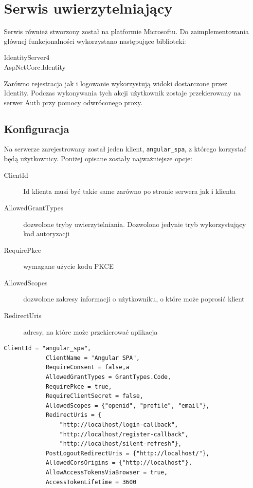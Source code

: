 \section{Serwis uwierzytelniający}
	Serwis również stworzony został na platformie Microsoftu.
	Do zaimplementowania głównej funkcjonalności wykorzystano następujące biblioteki:
	\begin{description}
		\item[IdentityServer4] 
		\item[AspNetCore.Identity] 
	\end{description}

	Zarówno rejestracja jak i logowanie wykorzystują widoki dostarczone przez Identity.
	Podczas wykonywania tych akcji użytkownik zostaje przekierowany na serwer Auth przy pomocy odwróconego proxy.

	\subsection{Konfiguracja}
		Na serwerze zarejestrowany został jeden klient, \verb|angular_spa|, z którego korzystać będą użytkownicy.
		Poniżej opisane zostały najważniejsze opcje:
		\begin{description}
			\item[ClientId] Id klienta musi być takie same zarówno po stronie serwera jak i klienta
			\item[AllowedGrantTypes] dozwolone tryby uwierzytelniania. Dozwolono jedynie tryb wykorzystujący kod autoryzacji
			\item[RequirePkce] wymagane użycie kodu PKCE
			\item[AllowedScopes] dozwolone zakresy informacji o użytkowniku, o które może poprosić klient
			\item[RedirectUris] adresy, na które może przekierować aplikacja
		\end{description}
		\begin{lstlisting}[label=lst:openIdSrv, caption=Konfiguracja OpenId po stronie serwera, float]
			ClientId = "angular_spa",
			ClientName = "Angular SPA",
			RequireConsent = false,a
			AllowedGrantTypes = GrantTypes.Code,
			RequirePkce = true,
			RequireClientSecret = false,
			AllowedScopes = {"openid", "profile", "email"},
			RedirectUris = {
				"http://localhost/login-callback",
				"http://localhost/register-callback",
				"http://localhost/silent-refresh"},
			PostLogoutRedirectUris = {"http://localhost/"},
			AllowedCorsOrigins = {"http://localhost"},
			AllowAccessTokensViaBrowser = true,
			AccessTokenLifetime = 3600
		\end{lstlisting}

